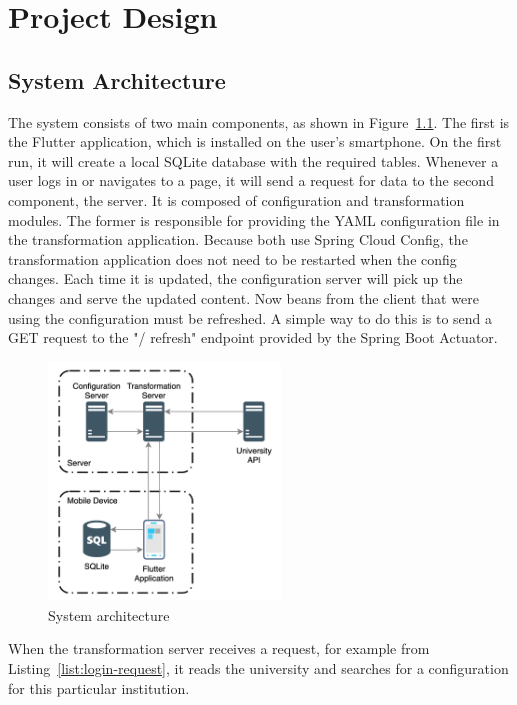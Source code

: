 \chapter{Project Design}
\section{System Architecture}

The system consists of two main components, as shown in Figure~\ref{fig:sys-architecture}. The first is the Flutter application, which is installed on the user's smartphone. On the first run, it will create a local SQLite database with the required tables. Whenever a user logs in or navigates to a page, it will send a request for data to the second component, the server. It is composed of configuration and transformation modules. The former is responsible for providing the YAML configuration file in the transformation application. Because both use Spring Cloud Config, the transformation application does not need to be restarted when the config changes. Each time it is updated, the configuration server will pick up the changes and serve the updated content. Now beans from the client that were using the configuration must be refreshed. A simple way to do this is to send a GET request to the "/ refresh" endpoint provided by the Spring Boot Actuator.

\begin{figure}[htb]
    \centering
    \includegraphics[width=0.55\textwidth]{fig03/system_architecture.png}
    \caption{System architecture}
    \label{fig:sys-architecture}
\end{figure}

When the transformation server receives a request, for example from Listing~\ref{list:login-request}, it reads the university and searches for a configuration for this particular institution.

